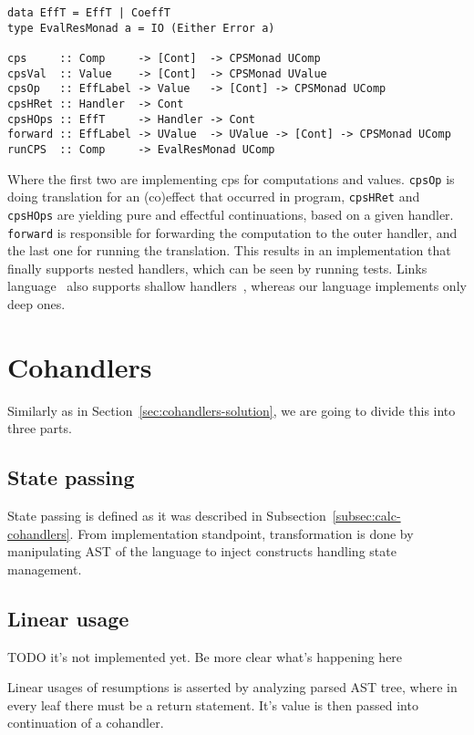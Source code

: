 \documentclass[declaration,shortabstract]{iithesis}
\theoremstyle{definition} \newtheorem{definition}{Definition}[chapter]
\theoremstyle{remark} \newtheorem{remark}[definition]{Observation}
\theoremstyle{plain} \newtheorem{theorem}[definition]{Theorem}
\theoremstyle{plain} \newtheorem{lemma}[definition]{Lemma}
\begin{document}
\begin{verbatim}
data EffT = EffT | CoeffT
type EvalResMonad a = IO (Either Error a)

cps     :: Comp     -> [Cont]  -> CPSMonad UComp
cpsVal  :: Value    -> [Cont]  -> CPSMonad UValue
cpsOp   :: EffLabel -> Value   -> [Cont] -> CPSMonad UComp
cpsHRet :: Handler  -> Cont
cpsHOps :: EffT     -> Handler -> Cont
forward :: EffLabel -> UValue  -> UValue -> [Cont] -> CPSMonad UComp
runCPS  :: Comp     -> EvalResMonad UComp
\end{verbatim}

    \noindent
    Where the first two are implementing cps for computations and values.
    \verb!cpsOp! is doing translation for an (co)effect that occurred in program,
    \verb!cpsHRet! and \verb!cpsHOps! are yielding pure and effectful continuations,
    based on a given handler. \verb!forward! is responsible for forwarding the
    computation to the outer handler, and the last one for running the
    translation. This results in an
    implementation that finally supports nested handlers, which can be seen by
    running tests. Links language~\cite{handlers-cps-journal} also supports
    shallow handlers~\cite{shallow-handlers}, whereas our language implements
    only deep ones.

    \section{Cohandlers}

    Similarly as in Section~\ref{sec:cohandlers-solution}, we are going to
    divide this into three parts.

    \subsection{State passing}

    State passing is defined as it was described in
    Subsection~\ref{subsec:calc-cohandlers}.
    From implementation standpoint, transformation is done by manipulating
    AST of the language to inject constructs handling state management.

    \subsection{Linear usage}

    TODO it's not implemented yet. Be more clear what's happening here

    Linear usages of resumptions is asserted by analyzing parsed AST tree,
    where in every leaf there must be a return statement. It's value is then
    passed into continuation of a cohandler.
\end{document}
